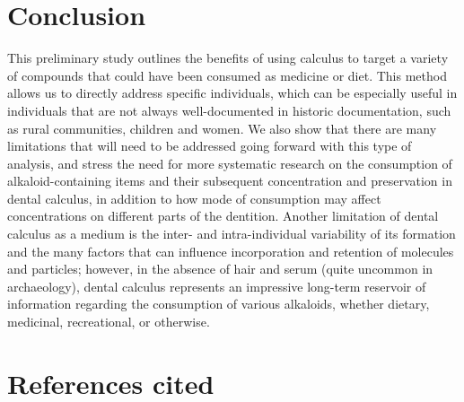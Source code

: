 \documentclass[
  b5paper,
]{book}
\begin{document}
\section{Conclusion}\label{conclusion-1}

This preliminary study outlines the benefits of using calculus to target
a variety of compounds that could have been consumed as medicine or
diet. This method allows us to directly address specific individuals,
which can be especially useful in individuals that are not always
well-documented in historic documentation, such as rural communities,
children and women. We also show that there are many limitations that
will need to be addressed going forward with this type of analysis, and
stress the need for more systematic research on the consumption of
alkaloid-containing items and their subsequent concentration and
preservation in dental calculus, in addition to how mode of consumption
may affect concentrations on different parts of the dentition. Another
limitation of dental calculus as a medium is the inter- and
intra-individual variability of its formation and the many factors that
can influence incorporation and retention of molecules and particles;
however, in the absence of hair and serum (quite uncommon in
archaeology), dental calculus represents an impressive long-term
reservoir of information regarding the consumption of various alkaloids,
whether dietary, medicinal, recreational, or otherwise.

\section*{References cited}\label{references-cited-4}

\end{document}
